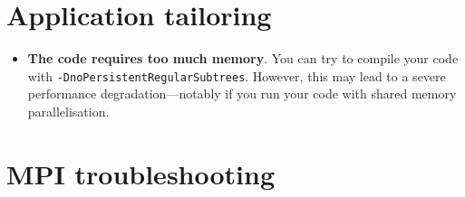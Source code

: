 \section{Application tailoring}

\begin{itemize}
  \item {\bf The code requires too much memory}.
  You can try to compile your code with
  \linebreak \texttt{-DnoPersistentRegularSubtrees}.
  However, this may lead to a severe performance \linebreak
  degradation---notably if you run your code with shared memory parallelisation.
\end{itemize}

\section{MPI troubleshooting}

